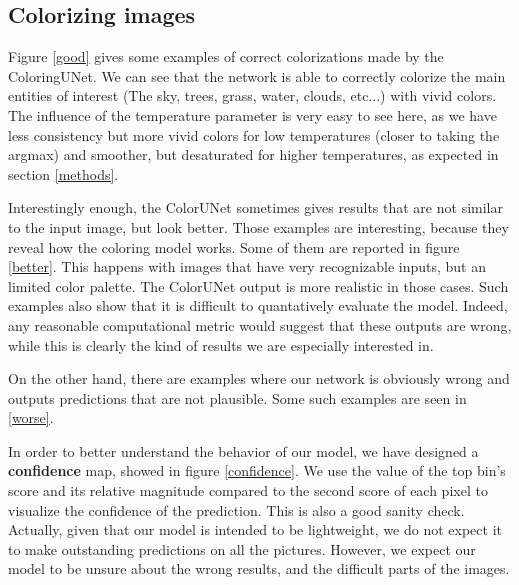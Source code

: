 \documentclass[10pt,twocolumn,letterpaper]{article}
\begin{document}
\subsection{Colorizing images}

Figure \ref{good} gives some examples of correct colorizations made by the ColoringUNet. We can see that the network is able to correctly colorize the main entities of interest (The sky, trees, grass, water, clouds, etc...) with vivid colors. The influence of the temperature parameter is very easy to see here, as we have less consistency but more vivid colors for low temperatures (closer to taking the argmax) and smoother, but desaturated for higher temperatures, as expected in section \ref{methods}.

Interestingly enough, the ColorUNet sometimes gives results that are not similar to the input image, but look better. Those examples are interesting, because they reveal how the coloring model works. Some of them are reported in figure \ref{better}. This happens with images that have very recognizable inputs, but an limited color palette. The ColorUNet output is more realistic in those cases.
Such examples also show that it is difficult to quantatively evaluate the model. Indeed, any reasonable computational metric would suggest that these outputs are wrong, while this is clearly the kind of results we are especially interested in.

On the other hand, there are examples where our network is obviously wrong and outputs predictions that are not plausible. Some such examples are seen in \ref{worse}.

In order to better understand the behavior of our model, we have designed a \textbf{confidence} map, showed in figure \ref{confidence}. We use the value of the top bin's score and its relative magnitude compared to the second score of each pixel to visualize the confidence of the prediction. This is also a good sanity check. Actually, given that our model is intended to be lightweight, we do not expect it to make outstanding predictions on all the pictures. However, we expect our model to be unsure about the wrong results, and the difficult parts of the images.
\end{document}
